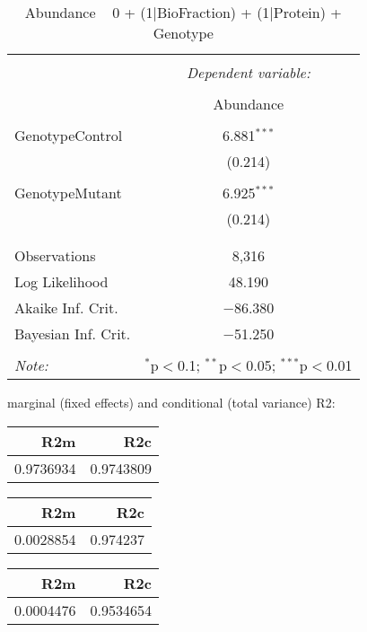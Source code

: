 \documentclass[11pt]{report}
\begin{document}
\begin{table}[!htbp] \centering 
  \caption{Abundance ~ 0 + (1|BioFraction) + (1|Protein) + Genotype} 
  \label{} 
\begin{tabular}{@{\extracolsep{5pt}}lc} 
\\[-1.8ex]\hline 
\hline \\[-1.8ex] 
 & \multicolumn{1}{c}{\textit{Dependent variable:}} \\ 
\cline{2-2} 
\\[-1.8ex] & Abundance \\ 
\hline \\[-1.8ex] 
 GenotypeControl & 6.881$^{***}$ \\ 
  & (0.214) \\ 
  & \\ 
 GenotypeMutant & 6.925$^{***}$ \\ 
  & (0.214) \\ 
  & \\ 
\hline \\[-1.8ex] 
Observations & 8,316 \\ 
Log Likelihood & 48.190 \\ 
Akaike Inf. Crit. & $-$86.380 \\ 
Bayesian Inf. Crit. & $-$51.250 \\ 
\hline 
\hline \\[-1.8ex] 
\textit{Note:}  & \multicolumn{1}{r}{$^{*}$p$<$0.1; $^{**}$p$<$0.05; $^{***}$p$<$0.01} \\ 
\end{tabular} 
\end{table} 
marginal (fixed effects) and conditional (total variance) R2:

\begin{tabular}{r|r}
\hline
R2m & R2c\\
\hline
0.9736934 & 0.9743809\\
\hline
\end{tabular}

\begin{tabular}{r|r}
\hline
R2m & R2c\\
\hline
0.0028854 & 0.974237\\
\hline
\end{tabular}

\begin{tabular}{r|r}
\hline
R2m & R2c\\
\hline
0.0004476 & 0.9534654\\
\hline
\end{tabular}
\end{document}
